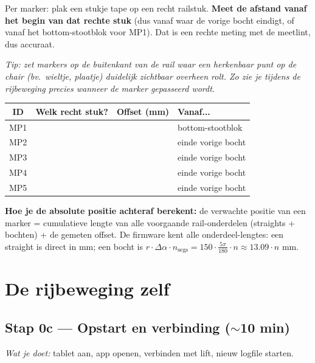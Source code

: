 \documentclass[11pt, a4paper]{article}
\begin{document}
Per marker: plak een stukje tape op een recht railstuk. \textbf{Meet
de afstand vanaf het begin van dat rechte stuk} (dus vanaf waar de
vorige bocht eindigt, of vanaf het bottom-stootblok voor MP1). Dat is
een rechte meting met de meetlint, dus accuraat.

\textit{Tip: zet markers op de buitenkant van de rail waar een
herkenbaar punt op de chair (bv.\ wieltje, plaatje) duidelijk
zichtbaar overheen rolt. Zo zie je tijdens de rijbeweging precies
wanneer de marker gepasseerd wordt.}

\renewcommand{\arraystretch}{2.0}
\begin{tabular}{@{}|c|p{5.5cm}|p{2cm}|p{2.5cm}|@{}}
\hline
\textbf{ID} & \textbf{Welk recht stuk?} & \textbf{Offset (mm)} & \textbf{Vanaf...} \\ \hline
MP1 & & & bottom-stootblok \\ \hline
MP2 & & & einde vorige bocht \\ \hline
MP3 & & & einde vorige bocht \\ \hline
MP4 & & & einde vorige bocht \\ \hline
MP5 & & & einde vorige bocht \\ \hline
\end{tabular}
\renewcommand{\arraystretch}{1.0}

\textbf{Hoe je de absolute positie achteraf berekent:} de
verwachte positie van een marker = cumulatieve lengte van alle
voorgaande rail-onderdelen (straights + bochten) + de gemeten offset.
De firmware kent alle onderdeel-lengtes: een straight is direct in
mm; een bocht is $r \cdot \Delta\alpha \cdot n_{\text{segs}} = 150
\cdot \frac{5\pi}{180} \cdot n \approx 13.09 \cdot n$ mm.

\section{De rijbeweging zelf}

\subsection{Stap 0c — Opstart en verbinding ($\sim$10 min)}

\textit{Wat je doet:} tablet aan, app openen, verbinden met lift,
nieuw logfile starten.
\end{document}
